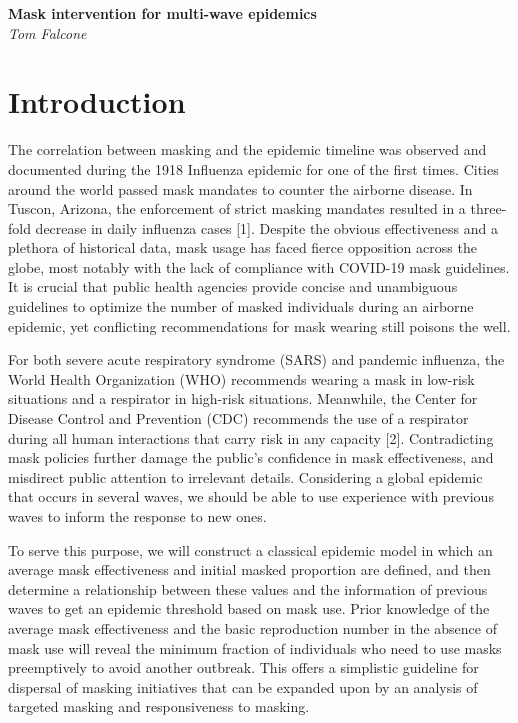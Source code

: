 \documentclass[11pt]{article}
\begin{document}
\begin{center}
\Large\textbf{Mask intervention for multi-wave epidemics}\\
\large\textit{Tom Falcone}
\end{center}

\section*{Introduction}
The correlation between masking and the epidemic timeline was observed and documented during the 1918 Influenza epidemic for one of the first times. Cities around the world passed mask mandates to counter the airborne disease. In Tuscon, Arizona, the enforcement of strict masking mandates resulted in a three-fold decrease in daily influenza cases [1].
Despite the obvious effectiveness and a plethora of historical data, mask usage has faced fierce opposition across the globe, most notably with the lack of compliance with COVID-19 mask guidelines. It is crucial that public health agencies provide concise and unambiguous guidelines to optimize the number of masked individuals during an airborne epidemic, yet conflicting recommendations for mask wearing still poisons the well.

For both severe acute respiratory syndrome (SARS) and pandemic influenza, the World Health Organization (WHO) recommends wearing a mask in low-risk situations and a respirator in high-risk situations. Meanwhile, the Center for Disease Control and Prevention (CDC) recommends the use of a respirator during all human interactions that carry risk in any capacity [2]. Contradicting mask policies further damage the public's confidence in mask effectiveness, and misdirect public attention to irrelevant details. Considering a global epidemic that occurs in several waves, we should be able to use experience with previous waves to inform the response to new ones.

To serve this purpose, we will construct a classical epidemic model in which an average mask effectiveness and initial masked proportion are defined, and then determine a relationship between these values and the information of previous waves to get an epidemic threshold based on mask use. Prior knowledge of the average mask effectiveness and the basic reproduction number in the absence of mask use will reveal the minimum fraction of individuals who need to use masks preemptively to avoid another outbreak. This offers a simplistic guideline for dispersal of masking initiatives that can be expanded upon by an analysis of targeted masking and responsiveness to masking.
\end{document}
